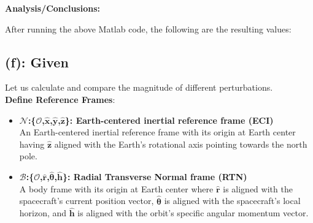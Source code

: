 \documentclass[titlepage]{article}
\begin{document}
\textbf{Analysis/Conclusions:}
\begin{mdframed}[linewidth=1pt, innertopmargin=10pt, innerbottommargin=10pt]
	After running the above Matlab code, the following are the resulting values:
	\begin{table}[H]
		\centering
		\caption{Newton's method iterations for Kepler's equation ($e = 0.4$, $M = 60^\circ$).}
		\label{tab:kepler_newton}
	\end{table}
	
\end{mdframed}

\subsection*{(f): Given}
Let us calculate and compare the magnitude of different perturbations.\\

\textbf{Define Reference Frames}:
\begin{itemize}
	\item \textbf{$\mathcal{N}$:\{$\mathcal{O}$,$\hat{\boldsymbol{x}}$,$\hat{\boldsymbol{y}}$,$\hat{\boldsymbol{z}}$\}: Earth-centered inertial reference frame (ECI)\\}An Earth-centered inertial reference frame with its origin at Earth center having $\hat{\boldsymbol{z}}$ aligned with the Earth's rotational axis pointing towards the north pole.
	\item \textbf{$\mathcal{B}$:\{$\mathcal{O}$,$\hat{\boldsymbol{r}}$,$\hat{\boldsymbol{\theta}}$,$\hat{\boldsymbol{h}}$\}: Radial Transverse Normal frame (RTN)\\}A body frame with its origin at Earth center where $\hat{\boldsymbol{r}}$ is aligned with the spacecraft's current position vector, $\hat{\boldsymbol{\theta}}$ is aligned with the spacecraft's local horizon, and $\hat{\boldsymbol{h}}$ is aligned with the orbit's specific angular momentum vector.
\end{itemize}
\end{document}
